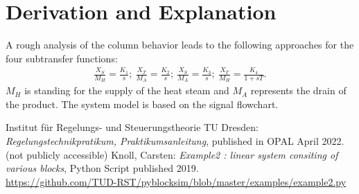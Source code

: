 \documentclass[10pt,a4paper]{article}
\begin{document}
	
	\section{Derivation and Explanation} %
	A rough analysis of the column behavior leads to the following approaches for the four subtransfer functions:
	\begin{align*}
		\frac{X_S}{M_H} = \frac{K_1}{s};\ \frac{X_T}{M_A} = \frac{K_2}{s};\ \frac{X_S}{M_A} = \frac{K_3}{s};\ \frac{X_T}{M_H} = \frac{K_4}{1 + sT}.
	\end{align*}
	$M_H$ is standing for the supply of the heat steam and $M_A$ represents the drain of the product. The system model is based on the signal flowchart.
	
	
	\begin{thebibliography}{10}		
		Institut für Regelungs- und Steuerungstheorie TU Dresden: \textit{Regelungstechnikpratikum, Praktikumsanleitung}, published in OPAL April 2022. \\
		(not publicly accessible)
		Knoll, Carsten: \textit{Example2 : linear system consiting of various blocks}, Python Script published 2019. \\
		\url{https://github.com/TUD-RST/pyblocksim/blob/master/examples/example2.py}  
	\end{thebibliography}
\end{document}
